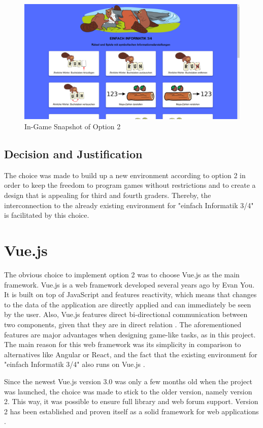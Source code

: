 \begin{figure}[H]
    \centering
    \includegraphics[width=1.0\columnwidth]{figures/P22.png}
    \caption{In-Game Snapshot of Option 2}
    \label{fig:P22} 
\end{figure}

\subsection{Decision and Justification}
The choice was made to build up a new environment according to option 2 in order to keep the freedom to program games without restrictions and to create a design that is appealing for third and fourth graders. Thereby, the interconnection to the already existing environment for "einfach Informatik 3/4" \cite{FBBT} is facilitated by this choice.

\section{Vue.js}
\label{section:vuejs}
The obvious choice to implement option 2 was to choose Vue.js as the main framework. Vue.js is a web framework developed several years ago by Evan You. It is built on top of JavaScript and features reactivity, which means that changes to the data of the application are directly applied and can immediately be seen by the user. Also, Vue.js features direct bi-directional communication between two components, given that they are in direct relation \cite{Vue}. The aforementioned features are major advantages when designing game-like tasks, as in this project. The main reason for this web framework was its simplicity in comparison to alternatives like Angular or React, and the fact that the existing environment for "einfach Informatik 3/4" also runs on Vue.js \cite{FBBT}.

Since the newest Vue.js version 3.0 was only a few months old when the project was launched, the choice was made to stick to the older version, namely version 2. This way, it was possible to ensure full library and web forum support. Version 2 has been established and proven itself as a solid framework for web applications \cite{Vue}.


